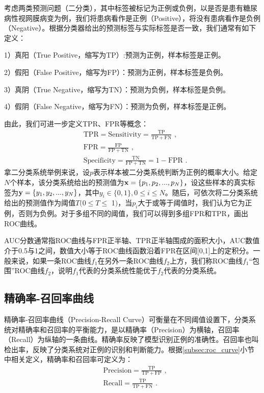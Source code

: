 考虑两类预测问题（二分类），其中标签被标记为正例或负例，以是否是患有糖尿病性视网膜病变为例，我们将患病看作是正例（Positive），将没有患病看作是负例（Negative）。根据分类器给出的预测标签与实际标签是否一致，我们通常有如下定义：

1）真阳（True Positive，缩写为TP）:预测为正例，样本标签是正例。

2）假阳（False Positive，缩写为FP）：预测为正例，样本标签是负例。

3）真阴（True Negative，缩写为TN）：预测为负例，样本标签是负例。

4）假阴（False Negative，缩写为FN）：预测为负例，样本标签是正例。

\noindent 由此，我们可进一步定义TPR、FPR等概念：
\vspace{-0.3cm}
\begin{align}
	&\mathrm{TPR}=\mathrm{Sensitivity}=\frac{\mathrm{TP}}{\mathrm{TP}+\mathrm{FN}}\,\, ,\\
	&\mathrm{FPR}=\frac{\mathrm{FP}}{\mathrm{FP}+\mathrm{TN}}\,\, ,\\
	&\mathrm{Specificity}=\frac{\mathrm{TN}}{\mathrm{FP}+\mathrm{TN}}=1-\mathrm{FPR}\,\, .
\end{align}
拿二分类系统举例来说，设$p$表示样本被二分类系统判断为正例的概率大小。给定$N$个样本，该分类系统给出的预测值为$\mathbf{x}=\{p_1,p_2,...,p_N
\}$，设这些样本的真实标签为$\mathbf{y}=\{y_1,y_2,...,y_N\}$，其中$y_i \in \{0,1\},0\leq i \le N$。随后，可依次将二分类系统给出的预测值作为阈值$T($0$\leq T \leq$ 1$)$，当$p_i$大于或等于阈值时，我们认为它为正例，否则为负例。对于多组不同的阈值，我们可以得到多组FPR和TPR，画出ROC曲线。

AUC分数通常指ROC曲线与FPR正半轴、TPR正半轴围成的面积大小，AUC数值介于0.5与1之间，数值大小等于ROC曲线函数沿着FPR在区间[0,1]上的定积分。一般来说，如果一条ROC曲线$f_1$在另外一条ROC曲线$f_2$上方，我们称ROC曲线$f_1$“包围”ROC曲线$f_2$，说明$f_1$代表的分类系统性能优于$f_2$代表的分类系统。
\subsection{精确率-召回率曲线}\label{subsec:pr_curve}
精确率-召回率曲线（Precision-Recall Curve）可衡量在不同阈值设置下，分类系统对精确率和召回率的平衡能力，是以精确率（Precision）为横轴，召回率（Recall）为纵轴的一条曲线。精确率反映了模型识别正例的准确性。召回率也叫检出率，反映了分类系统对正例的识别和判断能力。根据\ref{subsec:roc_curve}小节中相关定义，精确率和召回率可定义为：
\vspace{-0.3cm}
\begin{align}
	&\mathrm{Precision}=\frac{\mathrm{TP}}{\mathrm{TP}+\mathrm{FP}}\, \, ,\\
	&\mathrm{Recall}=\frac{\mathrm{TP}}{\mathrm{TP}+\mathrm{FN}}\, \, .
\end{align}

